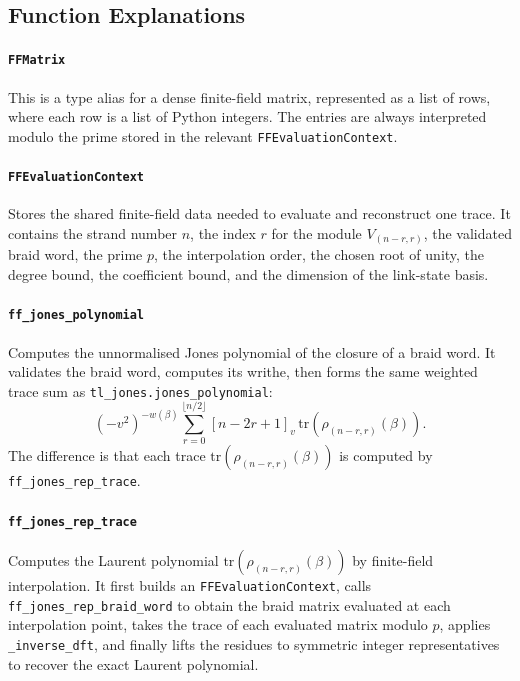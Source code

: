 \documentclass[10pt]{article}
\newcommand{\Tr}{\mathrm{tr}}
\newcommand{\qq}[1]{\left[#1\right]_v}
\begin{document}
\newpage
\subsection*{Function Explanations}

\paragraph{\texttt{FFMatrix}}
This is a type alias for a dense finite-field matrix, represented as a list of rows, where each row is a list of Python integers.
The entries are always interpreted modulo the prime stored in the relevant \texttt{FFEvaluationContext}.

\paragraph{\texttt{FFEvaluationContext}}
Stores the shared finite-field data needed to evaluate and reconstruct one trace.
It contains the strand number \(n\), the index \(r\) for the module \(V_{(n-r,r)}\), the validated braid word, the prime \(p\), the interpolation order, the chosen root of unity, the degree bound, the coefficient bound, and the dimension of the link-state basis.

\paragraph{\texttt{ff\_jones\_polynomial}}
Computes the unnormalised Jones polynomial of the closure of a braid word.
It validates the braid word, computes its writhe, then forms the same weighted trace sum as \texttt{tl\_jones.jones\_polynomial}:
\[
(-v^2)^{-w(\beta)}
\sum_{r=0}^{\lfloor n/2\rfloor}
\qq{n-2r+1}\,
\Tr(\rho_{(n-r,r)}(\beta)).
\]
The difference is that each trace \(\Tr(\rho_{(n-r,r)}(\beta))\) is computed by \texttt{ff\_jones\_rep\_trace}.

\paragraph{\texttt{ff\_jones\_rep\_trace}}
Computes the Laurent polynomial \(\Tr(\rho_{(n-r,r)}(\beta))\) by finite-field interpolation.
It first builds an \texttt{FFEvaluationContext}, calls \texttt{ff\_jones\_rep\_braid\_word} to obtain the braid matrix evaluated at each interpolation point, takes the trace of each evaluated matrix modulo \(p\), applies \texttt{\_inverse\_dft}, and finally lifts the residues to symmetric integer representatives to recover the exact Laurent polynomial.
\end{document}
